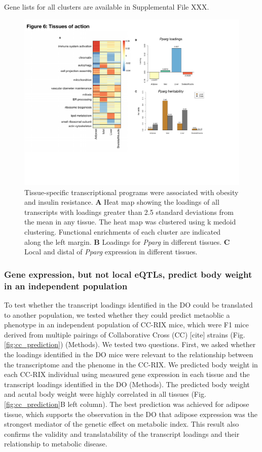 \documentclass[
]{article}
\begin{document}
Gene lists for all clusters are available in Supplemental File XXX.

\begin{figure}[ht!]
\includegraphics[width=\textwidth]{Figures/Fig6_TOA.pdf} 
\caption{Tissue-specific transcriptional programs were associated 
with obesity and insulin resistance. \textbf{A} Heat map showing 
the loadings of all transcripts with loadings greater than 2.5 
standard deviations from the mean in any tissue. The heat map was 
clustered using k medoid clustering. Functional enrichments of each 
cluster are indicated along the left margin. \textbf{B} Loadings for 
\textit{Pparg} in different tissues. \textbf{C} Local and distal of 
\textit{Pparg} expression in different tissues.
}
\label{fig:toa}
\end{figure}

\subsubsection{Gene expression, but not local eQTLs, predict body weight
in an independent
population}\label{gene-expression-but-not-local-eqtls-predict-body-weight-in-an-independent-population}

To test whether the transcript loadings identified in the DO could be
translated to another population, we tested whether they could predict
metaoblic a phenotype in an independent population of CC-RIX mice, which
were F1 mice derived from multiple pairings of Collaborative Cross (CC)
{[}cite{]} strains (Fig. \ref{fig:cc_prediction}) (Methods). We tested
two questions. First, we asked whether the loadings identified in the DO
mice were relevant to the relationship between the transcriptome and the
phenome in the CC-RIX. We predicted body weight in each CC-RIX
individual using measured gene expression in each tissue and the
transcript loadings identified in the DO (Methods). The predicted body
weight and acutal body weight were highly correlated in all tissues
(Fig. \ref{fig:cc_prediction}B left column). The best prediction was
achieved for adipose tissue, which supports the observation in the DO
that adipose expression was the strongest mediator of the genetic effect
on metabolic index. This result also confirms the validity and
translatability of the transcript loadings and their relationship to
metabolic disease.
\end{document}
